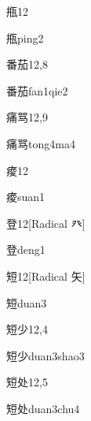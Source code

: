 \begin{entry}{甁}{12}
  \begin{phonetics}{甁}{ping2}
  \end{phonetics}
\end{entry}

\begin{entry}{番茄}{12,8}
  \begin{phonetics}{番茄}{fan1qie2}
  \end{phonetics}
\end{entry}

\begin{entry}{痛骂}{12,9}
  \begin{phonetics}{痛骂}{tong4ma4}
  \end{phonetics}
\end{entry}

\begin{entry}{痠}{12}
  \begin{phonetics}{痠}{suan1}
  \end{phonetics}
\end{entry}

\begin{entry}{登}{12}[Radical 癶]
  \begin{phonetics}{登}{deng1}
  \end{phonetics}
\end{entry}

\begin{entry}{短}{12}[Radical ⽮]
  \begin{phonetics}{短}{duan3}
  \end{phonetics}
\end{entry}

\begin{entry}{短少}{12,4}
  \begin{phonetics}{短少}{duan3shao3}
  \end{phonetics}
\end{entry}

\begin{entry}{短处}{12,5}
  \begin{phonetics}{短处}{duan3chu4}
  \end{phonetics}
\end{entry}

